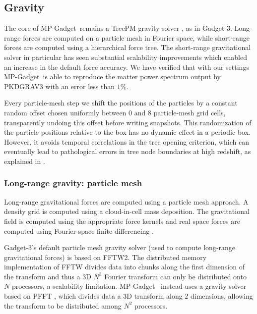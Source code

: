 \documentclass[fleqn,usenatbib]{mnras}
\newcommand{\software}[1]{{\small #1}}
\newcommand{\mpgadget}{\software{MP-Gadget}}
\begin{document}
\subsection{Gravity}
\label{sec:gravity}
The core of \mpgadget~remains a TreePM gravity solver \citep{Xu:1995, Bagla:2002, Springel:2005}, as in Gadget-3. Long-range forces are computed on a particle mesh in Fourier space, while short-range forces are computed using a hierarchical force tree. The short-range gravitational solver in particular has seen substantial scalability improvements which enabled an increase in the default force accuracy. We have verified that with our settings \mpgadget~is able to reproduce the matter power spectrum output by PKDGRAV3 \cite{2016JCAP...04..047S} with an error less than $1\%$. 

Every particle-mesh step we shift the positions of the particles by a constant random offset chosen uniformly between $0$ and $8$ particle-mesh grid cells, transparently undoing this offset before writing snapshots. This randomization of the particle positions relative to the box has no dynamic effect in a periodic box. However, it avoids temporal correlations in the tree opening criterion, which can eventually lead to pathological errors in tree node boundaries at high redshift, as explained in \cite{2020arXiv201003567S}.

\subsubsection{Long-range gravity: particle mesh}

Long-range gravitational forces are computed using a particle mesh approach. A density grid is computed using a cloud-in-cell mass deposition. The gravitational field is computed using the appropriate force kernels and real space forces are computed using Fourier-space finite differencing \citep[as in the HACC code:][]{2014arXiv1410.2805H}.

Gadget-3's default particle mesh gravity solver 
(used to compute long-range gravitational forces) is based on FFTW2. The distributed memory implementation of FFTW divides data into chunks along the first dimension of the transform and thus a 3D $N^3$ Fourier transform can only be distributed onto $N$ processors, a scalability limitation. \mpgadget~ instead uses a gravity solver based on \software{PFFT} \citep{doi:10.1137/120885887}, which divides data a 3D transform along $2$ dimensions, allowing the transform to be distributed among $N^2$ processors.
\end{document}
